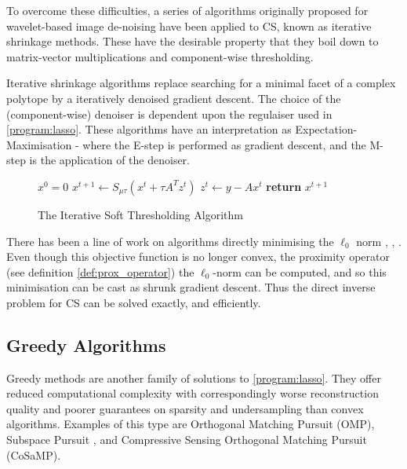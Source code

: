 To overcome these difficulties, a series of algorithms originally proposed for wavelet-based image de-noising have been applied to CS, known as iterative shrinkage methods. These have the desirable property that they boil down to matrix-vector multiplications and component-wise thresholding.

Iterative shrinkage algorithms replace searching for a minimal facet of a complex polytope by a iteratively denoised gradient descent. The choice of the (component-wise) denoiser is dependent upon the regulaiser used in \ref{program:lasso}. These algorithms have an interpretation as Expectation-Maximisation \cite{figueiredo2003algorithm} - where the E-step is performed as gradient descent, and the M-step is the application of the denoiser.

\begin{figure}
\begin{algorithmic}[1]
\State $x^0 = 0$
\State $x^{t+1} \gets S_{\mu\tau}\left(x^t + \tau A^Tz^t \right) $
\State $z^t \gets y - Ax^t$
\EndWhile
\State \textbf{return} $x^{t+1}$
\EndProcedure
\end{algorithmic}
\caption{The Iterative Soft Thresholding Algorithm}\label{alg:IST}
\end{figure}

There has been a line of work on algorithms directly minimising the \(\ell_0\) norm \cite{wen2015efficient}, \cite{oxvig2012improving}, \cite{mohimani2010sparse}. Even though this objective function is no longer convex, the proximity operator (see definition \eqref{def:prox_operator}) the \(\ell_0\)-norm can be computed, and so this minimisation can be cast as shrunk gradient descent. Thus the direct inverse problem for CS can be solved exactly, and efficiently.

\subsection{Greedy Algorithms}
Greedy methods are another family of solutions to \ref{program:lasso}. They offer reduced computational complexity with correspondingly worse reconstruction quality and poorer guarantees on sparsity and undersampling than convex algorithms. Examples of this type are Orthogonal Matching Pursuit (OMP)\cite{tropp2007signal}, Subspace Pursuit \cite{dai2009subspace}, and Compressive Sensing Orthogonal Matching Pursuit (CoSaMP).


